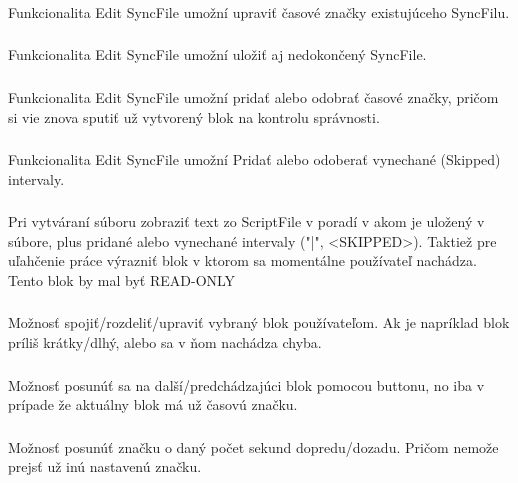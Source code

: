 \documentclass{article}
\begin{document}
\subsubsection{}
Funkcionalita Edit SyncFile umožní upraviť časové značky existujúceho SyncFilu.

\subsubsection{}
Funkcionalita Edit SyncFile umožní uložiť aj nedokončený SyncFile.

\subsubsection{}
Funkcionalita Edit SyncFile umožní pridať alebo odobrať časové značky, pričom si vie znova sputiť už vytvorený blok na kontrolu správnosti. 

\subsubsection{}
Funkcionalita Edit SyncFile umožní Pridať alebo odoberať vynechané (Skipped) intervaly.

\subsubsection{}
Pri vytváraní súboru zobraziť text zo ScriptFile v poradí v akom je uložený v súbore, plus pridané alebo vynechané intervaly ("|", <SKIPPED>). Taktiež pre uľahčenie práce výrazniť blok v ktorom sa momentálne používateľ nachádza. Tento blok by mal byť READ-ONLY

\subsubsection{}
Možnosť spojiť/rozdeliť/upraviť vybraný blok používateľom. Ak je napríklad blok príliš krátky/dlhý, alebo sa v ňom nachádza chyba. 

\subsubsection{}
Možnosť posunúť sa na další/predchádzajúci blok pomocou buttonu, no iba v prípade že aktuálny blok má už časovú značku.

\subsubsection{}
Možnosť posunúť značku o daný počet sekund dopredu/dozadu. Pričom nemože prejsť už inú nastavenú značku.
\end{document}
